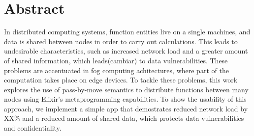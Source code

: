 
\chapter{Abstract}

In distributed computing systems, function entities live on a 
single machines, and data is shared between nodes in order to 
carry out calculations. This leads to undesirable characteristics,
such as increased network load and a greater amount of shared information, which leads(cambiar) to data vulnerabilities. These problems are accentuated in fog computing achitectures, where part of the computation takes place on edge devices. To tackle these problems, this work explores the use of pass-by-move semantics to distribute functions between many nodes using Elixir's metaprogramming capabilities. To show the usability of this approach, we implement a simple app that demostrates reduced network load by XX\% and a reduced amount of shared data, which protects data vulnerabilities and confidentiality.


\endinput


